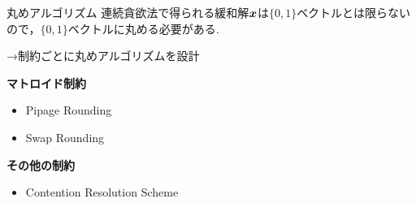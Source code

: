 \documentclass[14pt,aspectratio=169,xcolor=dvipsnames,table,onlytextwidth,dvipdfmx]{beamer}
\begin{document}

\begin{frame}{丸めアルゴリズム}
    連続貪欲法で得られる緩和解$\boldsymbol{x}$は$\{0,1\}$ベクトルとは限らないので，$\{0,1\}$ベクトルに丸める必要がある.

    →\alert{制約ごとに丸めアルゴリズムを設計}

    \vfill
    \textbf{マトロイド制約}
    \begin{itemize}
        \item Pipage Rounding~\cite{Calinescu2011}
        \item Swap Rounding~\cite{Chekuri2010}
    \end{itemize}

    \textbf{その他の制約}
    \begin{itemize}
        \item Contention Resolution Scheme~\cite{Vondrak2014}
    \end{itemize}
\end{frame}
\end{document}
